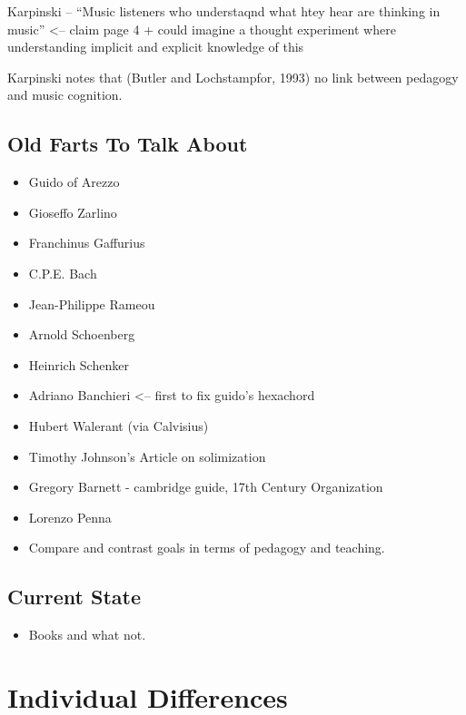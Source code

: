 \documentclass[]{book}
\providecommand{\tightlist}{%
  \setlength{\itemsep}{0pt}\setlength{\parskip}{0pt}}
\theoremstyle{definition}
\theoremstyle{definition}
\theoremstyle{definition}
\theoremstyle{remark}
\begin{document}
Karpinski -- ``Music listeners who understaqnd what htey hear are
thinking in music'' \textless{}-- claim page 4 + could imagine a thought
experiment where understanding implicit and explicit knowledge of this

Karpinski notes that (Butler and Lochstampfor, 1993) no link between
pedagogy and music cognition.

\hypertarget{old-farts-to-talk-about}{%
\section{Old Farts To Talk About}\label{old-farts-to-talk-about}}

\begin{itemize}
\item
  Guido of Arezzo
\item
  Gioseffo Zarlino
\item
  Franchinus Gaffurius
\item
  C.P.E. Bach
\item
  Jean-Philippe Rameou
\item
  Arnold Schoenberg
\item
  Heinrich Schenker
\item
  Adriano Banchieri \textless{}-- first to fix guido's hexachord
\item
  Hubert Walerant (via Calvisius)
\item
  Timothy Johnson's Article on solimization
\item
  Gregory Barnett - cambridge guide, 17th Century Organization
\item
  Lorenzo Penna
\item
  Compare and contrast goals in terms of pedagogy and teaching.
\end{itemize}

\hypertarget{current-state}{%
\section{Current State}\label{current-state}}

\begin{itemize}
\tightlist
\item
  Books and what not.
\end{itemize}

\hypertarget{individual-differences}{%
\chapter{Individual Differences}\label{individual-differences}}
\end{document}
